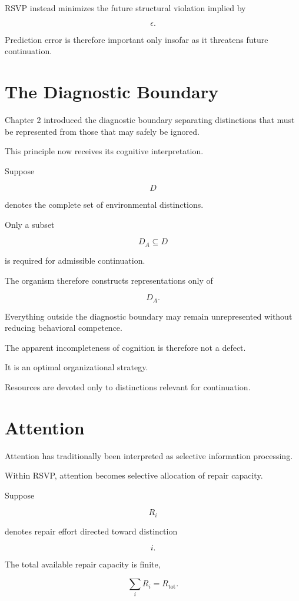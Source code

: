 \documentclass[11pt,oneside]{book}
\numberwithin{equation}{chapter}
\theoremstyle{definition}
\theoremstyle{plain}
\begin{document}
RSVP instead minimizes the future structural violation implied by

\[
\epsilon.
\]

Prediction error is therefore important only insofar as it threatens future
continuation.

\section{The Diagnostic Boundary}

Chapter 2 introduced the diagnostic boundary separating distinctions that
must be represented from those that may safely be ignored.

This principle now receives its cognitive interpretation.

Suppose

\[
D
\]

denotes the complete set of environmental distinctions.

Only a subset

\[
D_A \subseteq D
\]

is required for admissible continuation.

The organism therefore constructs representations only of

\[
D_A.
\]

Everything outside the diagnostic boundary may remain unrepresented without
reducing behavioral competence.

The apparent incompleteness of cognition is therefore not a defect.

It is an optimal organizational strategy.

Resources are devoted only to distinctions relevant for continuation.

\section{Attention}

Attention has traditionally been interpreted as selective information
processing.

Within RSVP, attention becomes selective allocation of repair capacity.

Suppose

\[
R_i
\]

denotes repair effort directed toward distinction

\[
i.
\]

The total available repair capacity is finite,

\[
\sum_i R_i = R_{\mathrm{tot}}.
\]
\end{document}

